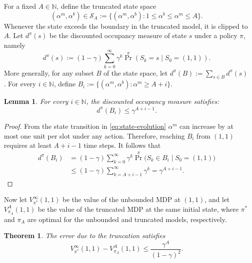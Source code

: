 \documentclass[letterpaper,journal]{IEEEtran}
\newtheorem{theorem}{Theorem}
\newtheorem{lemma}{Lemma}
\begin{document}
For a fixed $A\in\mathbb N$, define the truncated state space
\[
(\alpha^m,\alpha^b)\in \mathcal S_A := \{(\alpha^m,\alpha^b): 1\leq \alpha^b\leq \alpha^m\leq A\}.
\]
Whenever the state exceeds the boundary in the truncated model, it is clipped to $A$. Let $d^\pi(s)$ be the discounted occupancy measure of state $s$ under a policy $\pi$, namely
\[
d^\pi(s):=(1-\gamma)\sum_{k=0}^{\infty}\gamma^k \Pr^\pi\!\left(S_k=s\mid S_0=(1,1)\right).
\]
More generally, for any subset $B$ of the state space, let $d^\pi(B):=\sum_{s\in B} d^\pi(s)$. For every $i\in \mathbb N$, define $B_i:=\{(\alpha^m,\alpha^b): \alpha^m\geq A+i\}$.

\begin{lemma}\label{lem:outer-region-discounted-occupancy}
For every $i\in \mathbb N$, the discounted occupancy measure satisfies:
\[
d^\pi(B_i)\leq \gamma^{A+i-1}.
\]
\end{lemma}

\begin{proof}
From the state transition in \eqref{eq:state-evolution} $\alpha^m$ can increase by at most one unit per slot under any action. Therefore, reaching $B_i$ from $(1,1)$ requires at least $A+i-1$ time steps. It follows that
\begin{align*}
d^\pi(B_i)
&=(1-\gamma)\sum_{k=0}^{\infty}\gamma^k
\Pr^\pi\bigl(S_k\in B_i\mid S_0=(1,1)\bigr)\\
&\leq (1-\gamma)\sum_{k=A+i-1}^{\infty}\gamma^k
=\gamma^{A+i-1}.
\end{align*}
\end{proof}

Now let $V^\infty_{\pi^*}(1,1)$ be the value of the unbounded MDP at $(1,1)$, and let $V^A_{\pi_A}(1,1)$ be the value of the truncated MDP at the same initial state, where $\pi^*$ and $\pi_A$ are optimal for the unbounded and truncated models, respectively.

\begin{theorem}\label{th:truncation-error}
The error due to the truncation satisfies
\[
V^\infty_{\pi^*}(1,1)-V^A_{\pi_A}(1,1)\leq \frac{\gamma^A}{(1-\gamma)^2}.
\]
\end{theorem}
\end{document}
